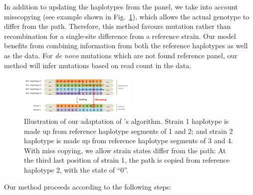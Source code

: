 \documentclass{bioinfo}
\begin{document}
In addition to updating the haplotypes from the panel, we take into account misscopying (see example shown in Fig.~\ref{fig:ls}), which allows the actual genotype to differ from the path. Therefore, this method favours mutation rather than recombination for a single-site difference from a reference strain. Our model benefits from combining information from both the reference haplotypes as well as the data. For {\em de novo} mutations which are not found reference panel, our method will infer mutations based on read count in the data.
\begin{figure}[tbh]
\centering
\includegraphics[width=0.5\textwidth]{coupled-painting.png}
\caption{Illustration of our adaptation of \citet{Li2003}'s algorithm. Strain 1 haplotype is made up from reference haplotype segments of 1 and 2; and strain 2 haplotype is made up from reference haplotype segments of 3 and 4. With miss copying, we allow strain states differ from the path: At the third last position of strain 1, the path is copied from reference haplotype 2, with the state of ``0''.
}\label{fig:ls}
\end{figure}
Our method proceeds according to the following steps:
\end{document}
